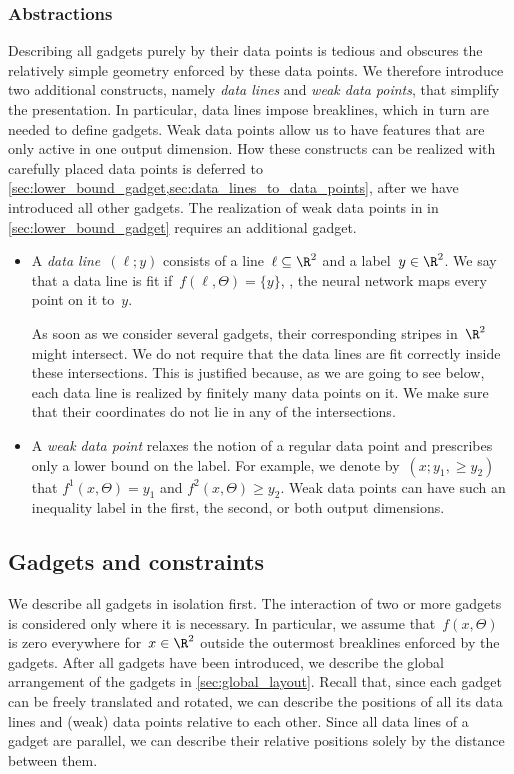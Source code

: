 \subsubsection{Abstractions}
Describing all gadgets purely by their data points is tedious and obscures the relatively simple geometry enforced by these data points.
We therefore introduce two additional constructs, namely \emph{data lines} and \emph{weak data points}, that simplify the presentation.
In particular, data lines impose breaklines, which in turn are needed to define gadgets.
Weak data points allow us to have features that are only active in one output dimension.
How these constructs can be realized with carefully placed data points is deferred to \cref{sec:lower_bound_gadget,sec:data_lines_to_data_points}, after we have introduced all other gadgets. The realization of weak data points in in \cref{sec:lower_bound_gadget} requires an additional gadget.

\begin{itemize}
    \item A \emph{data line}~$(\ell; y)$ consists of a line~$\ell \subseteq \R^2$ and a label~$y \in \R^2$.
    We say that a data line is fit if~$f(\ell, \Theta) = \{y\}$, \ie, the neural network maps every point on it to~$y$.
    
    As soon as we consider several gadgets, their corresponding stripes in~$\R^2$ might intersect.
    We do not require that the data lines are fit correctly inside these intersections.
    This is justified because, as we are going to see below, each data line is realized by finitely many data points on it.
    We make sure that their coordinates do not lie in any of the intersections.

    \item A \emph{weak data point} relaxes the notion of a regular data point and prescribes only a lower bound on the label.
    For example, we denote by~$(x; y_1, \geq y_2)$ that $f^1(x, \Theta) = y_1$ and $f^2(x, \Theta) \geq y_2$.
    Weak data points can have such an inequality label in the first, the second, or both output dimensions.
\end{itemize}

\subsection{Gadgets and constraints}
\label{sec:gadgets}

We describe all gadgets in isolation first.
The interaction of two or more gadgets is considered only where it is necessary.
In particular, we assume that~$f(x, \Theta)$ is %
zero everywhere %
for~$x \in \R^2$ outside the outermost breaklines enforced by %
%
%
%
the gadgets.  %
After all gadgets have been introduced, we describe the global arrangement of the gadgets in \cref{sec:global_layout}.
Recall that, since each gadget can be freely translated and rotated, we can describe the positions of all its data lines and (weak) data points relative to each other.
Since all data lines of a gadget are parallel, we can describe their relative positions solely by the distance between them.

